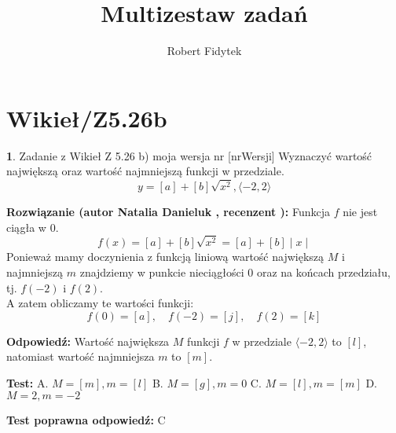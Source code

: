 \documentclass[12pt, a4paper]{article}
\title{Multizestaw zadań}
\author{Robert Fidytek}
\date{}
\theoremstyle{definition} %
\newtheorem{zad}{}
\newcommand{\kategoria}[1]{\section{#1}} %
\newcommand{\zadStart}[1]{\begin{zad}#1\newline} %
\newcommand{\zadStop}{\end{zad}}   %
\newcommand{\rozwStart}[2]{\noindent \textbf{Rozwiązanie (autor #1 , recenzent #2): }\newline} %
\newcommand{\rozwStop}{\newline}                                            %
\newcommand{\odpStart}{\noindent \textbf{Odpowiedź:}\newline}    %
\newcommand{\odpStop}{\newline}                                             %
\newcommand{\testStart}{\noindent \textbf{Test:}\newline} %
\newcommand{\testStop}{\newline} %
\newcommand{\kluczStart}{\noindent \textbf{Test poprawna odpowiedź:}\newline} %
\newcommand{\kluczStop}{\newline} %
\begin{document}
\maketitle

\kategoria{Wikieł/Z5.26b}

\zadStart{Zadanie z Wikieł Z 5.26 b) moja wersja nr [nrWersji]}
Wyznaczyć wartość największą oraz wartość najmniejszą funkcji w przedziale. 
$$y = [a] + [b]\sqrt{x^2 }, \langle-2,2\rangle$$
\zadStop

\rozwStart{Natalia Danieluk}{}
Funkcja $f$ nie jest ciągła w $0$. 
$$ f(x) = [a] + [b]\sqrt{x^2 } = [a] + [b]\mid x \mid $$
Ponieważ mamy doczynienia z funkcją liniową wartość największą $M$ i najmniejszą $m$ znajdziemy w punkcie nieciągłości $0$ oraz na końcach przedziału, tj. $f(-2)$ i $f(2)$. \\
A zatem obliczamy te wartości funkcji:
$$ f(0) = [a],\quad f(-2) = [j],\quad f(2) = [k] $$
\rozwStop

\odpStart
Wartość największa $M$ funkcji $f$ w przedziale $\langle-2,2\rangle$ to $[l]$, natomiast wartość najmniejsza $m$ to $[m]$.
\odpStop

\testStart
A. $M=[m], m=[l]$
B. $M=[g], m=0$
C. $M=[l], m=[m]$
D. $M=2, m=-2$
\testStop

\kluczStart
C
\kluczStop
\end{document}
